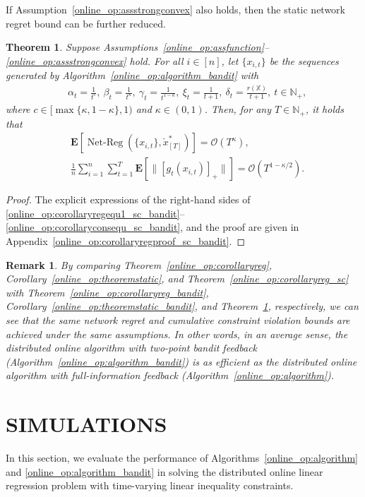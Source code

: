 \documentclass[12pt,draftcls,onecolumn]{IEEEtran}%
\newtheorem{theorem}{Theorem}
\newtheorem{remark}{Remark}
\DeclareMathOperator{\NetReg}{Net-Reg}
\begin{document}
If Assumption~\ref{online_op:assstrongconvex} also holds, then the static network regret bound can be further reduced.
\begin{theorem}\label{online_op:corollaryreg_sc_bandit}
	Suppose Assumptions~\ref{online_op:assfunction}--\ref{online_op:assstrongconvex} hold. For all $i\in[n]$, let $\{x_{i,t}\}$ be the sequences generated by Algorithm~\ref{online_op:algorithm_bandit} with
	\begin{align}\label{online_op:stepsize1_sc_bandit}
		&\alpha_t=\frac{1}{t^{c}},~\beta_t=\frac{1}{t^{\kappa}},
		~\gamma_t=\frac{1}{t^{1-\kappa}},~\xi_{t}=\frac{1}{t+1},~\delta_{t}=\frac{r(\mathbb{X})}{t+1},~t\in\mathbb{N}_+,
	\end{align} where $c\in[\max\{\kappa,1-\kappa\},1)$ and $\kappa\in(0,1)$. Then, for any $T\in\mathbb{N}_+$, it holds that
	\begin{align}
		&\mathbf{E}[\NetReg(\{x_{i,t}\},\check{x}^*_{[T]})]
		=\mathcal{O}(T^{\kappa}),\label{online_op:corollaryregequ1_sc_bandit}\\
		&\frac{1}{n}\sum_{i=1}^n\sum_{t=1}^T\mathbf{E}[\|[g_{t}(x_{i,t})]_+\|]=
		\mathcal{O}(T^{1-\kappa/2}).
		\label{online_op:corollaryconsequ_sc_bandit}
	\end{align}
\end{theorem}
\begin{proof}
The explicit expressions of the right-hand sides of \eqref{online_op:corollaryregequ1_sc_bandit}--\eqref{online_op:corollaryconsequ_sc_bandit}, and the proof are given in  Appendix~\ref{online_op:corollaryregproof_sc_bandit}.
\end{proof}
\begin{remark}\label{online_op:remark_sc_bandit}
	By comparing Theorem~\ref{online_op:corollaryreg}, Corollary~\ref{online_op:theoremstatic}, and Theorem~\ref{online_op:corollaryreg_sc} with Theorem~\ref{online_op:corollaryreg_bandit}, Corollary~\ref{online_op:theoremstatic_bandit}, and Theorem~\ref{online_op:corollaryreg_sc_bandit}, respectively, we can see that the same network regret and cumulative constraint violation bounds are achieved under the same assumptions. In other words, in an average sense, the distributed online algorithm with two-point bandit feedback (Algorithm~\ref{online_op:algorithm_bandit}) is as efficient as the distributed online algorithm with full-information feedback (Algorithm~\ref{online_op:algorithm}).
\end{remark}


\section{SIMULATIONS}\label{online_opsec:simulation}
In this section, we evaluate the performance of Algorithms~\ref{online_op:algorithm} and \ref{online_op:algorithm_bandit} in solving the distributed online linear regression problem with time-varying linear inequality constraints.
\end{document}
